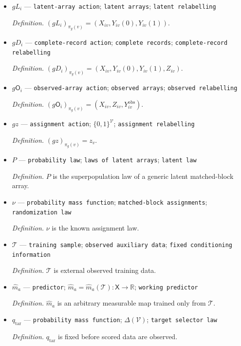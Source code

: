 \documentclass{article}
\begin{document}
\begin{itemize}
  \item \(gL_i\) --- \texttt{latent-\allowbreak{}array action}; \texttt{latent arrays}; \texttt{latent relabelling}
  \par\smallskip\noindent\emph{Definition.} \((gL_i)_{\pi_g(v)}=(X_{iv},Y_{iv}(0),Y_{iv}(1))\).
  \item \(gD_i\) --- \texttt{complete-\allowbreak{}record action}; \texttt{complete records}; \texttt{complete-\allowbreak{}record relabelling}
  \par\smallskip\noindent\emph{Definition.} \((gD_i)_{\pi_g(v)}=(X_{iv},Y_{iv}(0),Y_{iv}(1),Z_{iv})\).
  \item \(g\mathsf O_i\) --- \texttt{observed-\allowbreak{}array action}; \texttt{observed arrays}; \texttt{observed relabelling}
  \par\smallskip\noindent\emph{Definition.} \((g\mathsf O_i)_{\pi_g(v)}=(X_{iv},Z_{iv},Y^{\mathrm{obs}}_{iv})\).
  \item \(gz\) --- \texttt{assignment action}; \(\{0,1\}^{\mathcal V}\); \texttt{assignment relabelling}
  \par\smallskip\noindent\emph{Definition.} \((gz)_{\pi_g(v)}=z_v\).
  \item \(P\) --- \texttt{probability law}; \texttt{laws of latent arrays}; \texttt{latent law}
  \par\smallskip\noindent\emph{Definition.} \(P\) is the superpopulation law of a generic latent matched-block array.
  \item \(\nu\) --- \texttt{probability mass function}; \texttt{matched-\allowbreak{}block assignments}; \texttt{randomization law}
  \par\smallskip\noindent\emph{Definition.} \(\nu\) is the known assignment law.
  \item \(\mathcal T\) --- \texttt{training sample}; \texttt{observed auxiliary data}; \texttt{fixed conditioning information}
  \par\smallskip\noindent\emph{Definition.} \(\mathcal T\) is external observed training data.
  \item \(\widehat m_a\) --- \texttt{predictor}; \(\widehat m_a=\widehat m_a(\mathcal T):\mathsf X\to\mathbb R\); \texttt{working predictor}
  \par\smallskip\noindent\emph{Definition.} \(\widehat m_a\) is an arbitrary measurable map trained only from \(\mathcal T\).
  \item \(q_{\mathrm{tar}}\) --- \texttt{probability mass function}; \(\Delta(\mathcal V)\); \texttt{target selector law}
  \par\smallskip\noindent\emph{Definition.} \(q_{\mathrm{tar}}\) is fixed before scored data are observed.

\end{itemize}
\end{document}
